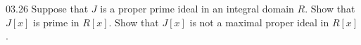 \documentclass[11pt]{article}
\begin{document}
\begin{problem}{03.26}
  Suppose that $J$ is a proper prime ideal in an integral domain $R$. Show that
  $J[x]$ is prime in $R[x]$. Show that $J[x]$ is not a maximal proper ideal in
  $R[x]$.
\end{problem}
\end{document}
